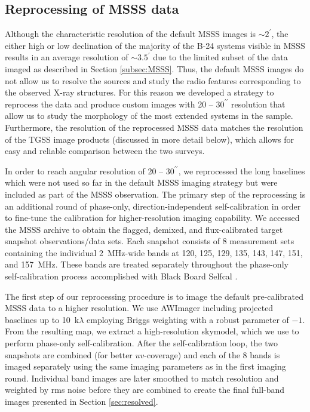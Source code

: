 \documentclass{aa}  %
\begin{document}
\subsection{Reprocessing of MSSS data}
\label{label:reprocessing}

Although the characteristic resolution of the default MSSS images is $\sim2^{\prime}$, the either high or low declination of the majority of the B-24 systems visible in MSSS results in an average resolution of $\sim3.5^{\prime}$ due to the limited subset of the data imaged as described in Section \ref{subsec:MSSS}.
Thus, the default MSSS images do not allow us to resolve the sources and study the radio features corresponding to the observed X-ray structures.
For this reason we developed a strategy to reprocess the data and produce custom images with  20 -- $30^{\prime\prime}$ resolution 
that allow us to study the morphology of the most extended systems in the sample.
Furthermore, the resolution of the reprocessed MSSS data matches the resolution of the TGSS image products (discussed in more detail below), which allows for easy and reliable comparison between the two surveys.

In order to reach angular resolution of 20 -- $30^{\prime\prime}$, we reprocessed the long baselines which were not used so far in the default MSSS imaging strategy but were included as part of the MSSS observation. 
The primary step of the reprocessing is an additional round of phase-only, direction-independent self-calibration in order to fine-tune the calibration for higher-resolution imaging capability.
We accessed the MSSS archive to obtain the flagged, demixed, and flux-calibrated target snapshot observations/data sets.
Each snapshot consists of 8 measurement sets containing the individual 2~MHz-wide bands at 120, 125, 129, 135, 143, 147, 151, and 157~MHz. These bands are treated separately throughout the phase-only self-calibration process accomplished with Black Board Selfcal \citep[BBS;][]{Pandey2009}.

The first step of our reprocessing procedure is to image the default pre-calibrated MSSS data to a higher resolution. 
We use AWImager including projected baselines up to 10~k$\lambda$ employing Briggs weighting \citep{Briggs1995} with a robust parameter of $-1$. 
From the resulting map, we extract a high-resolution skymodel, which we use to perform phase-only self-calibration. 
After the self-calibration loop, the two snapshots are combined (for better $uv$-coverage) and each of the 8 bands is imaged separately using the same imaging parameters as in the first imaging round.
Individual band images are later smoothed to match resolution and weighted by rms noise before they are combined to create the final full-band images presented in Section \ref{sec:resolved}.
\end{document}
